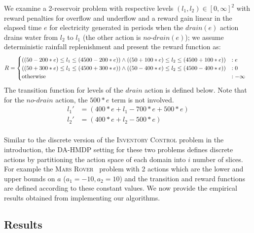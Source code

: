 \documentclass[twoside,11pt]{article}
\newcommand{\MarsRover}{\textsc{Mars Rover }}
\newcommand{\InventoryControl}{\textsc{Inventory Control }}
\begin{document}
We examine a 2-reservoir problem with
respective levels $(l_1,l_2)\in [0,\infty]^2$ with reward penalties for 
overflow and underflow and a reward gain linear in the elapsed time $e$ for
electricity generated in periods when the $\mathit{drain}(e)$ action
drains water from $l_2$ to $l_1$ (the other action is 
$\mathit{no}$-$\mathit{drain}(e)$); we assume deterministic rainfall
replenishment and present the reward function as:  
\vspace{-4mm}
{\footnotesize
\begin{align*}
R & = \begin{cases}
((50-200*e) \leq l_1 \leq (4500-200*e)) \wedge ((50+100*e) \leq l_2 \leq (4500+100*e)) %
&:e\\
((50+300*e) \leq l_1 \leq (4500+300*e)) \wedge ((50-400*e) \leq l_2 \leq (4500-400*e)) %
&:0\\
\text{\normalsize otherwise} &: -\infty \\
\end{cases}
\end{align*}}
The transition function for levels of the $\mathit{drain}$ action is defined below. Note that for the $\mathit{no}$-$\mathit{drain}$ action, the $\mathit{500 * e}$ term is not involved.
{%
\begin{align*}
l_1' & =(400 * e + l_1 -700 * e + 500 * e) \\
l_2'& =(400 * e + l_2 - 500 * e) \\
\end{align*}}

Similar to the discrete version of the \InventoryControl problem in the introduction, the DA-HMDP setting for these two problems defines discrete actions by partitioning the action space of each domain into $i$ number of slices. For example the \MarsRover\ problem with 2 actions which are the lower and upper bounds on $a$ ($a_1=-10, a_2 = 10$) and the transition and reward functions are defined according to these constant values.
We now provide the empirical results obtained from implementing our algorithms.

\subsection{Results}
\end{document}
